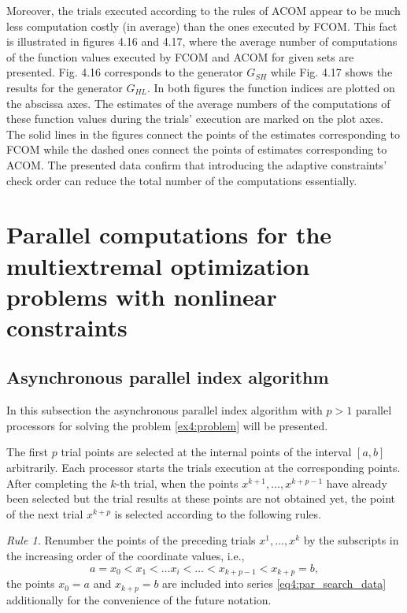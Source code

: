 Moreover, the trials executed according to the rules of ACOM appear to be much less computation costly (in average) than the ones executed by FCOM. This fact is illustrated in figures 4.16 and 4.17, where the average number of computations of the function values executed by FCOM and ACOM for given sets are presented. Fig. 4.16 corresponds to the generator $G_{SH}$ while Fig. 4.17 shows the results for the generator $G_{HL}$. In both figures the function indices are plotted on the abscissa axes. The estimates of the average numbers of the computations of these function values during the trials’ execution are marked on the plot axes. The solid lines in the figures connect the points of the estimates corresponding to FCOM while the dashed ones connect the points of estimates corresponding to ACOM. The presented data confirm that introducing the adaptive constraints’ check order can reduce the total number of the computations essentially.

\section{Parallel computations for the multiextremal optimization problems with nonlinear constraints}
\subsection{Asynchronous parallel index algorithm}
In this subsection the asynchronous parallel index algorithm with $p>1$ parallel processors for solving the problem \eqref{ex4:problem} will be presented.

The first $p$ trial points are selected at the internal points of the interval $[a,b]$ arbitrarily. Each processor starts the trials execution at the corresponding points. After completing the $k$-th trial, when the points $x^{k+1},\dots, x^{k+p - 1}$ have already been selected but the trial results at these points are not obtained yet, the point of the next trial $x^{k+p}$ is selected according to the following rules.

\emph{Rule 1.} Renumber the points of the preceding trials $x^1,\dots,x^k$ by the subscripts in the increasing order of the coordinate values, i.e.,
\begin{equation}
  \label{eq4:par_search_data}
  a=x_0<x_1<\dots x_i<\dots<x_{k+p-1}<x_{k+p}=b,
\end{equation}
the points $x_0=a$ and $x_{k + p}=b$ are included into series \eqref{eq4:par_search_data} additionally for the convenience of the future notation.

